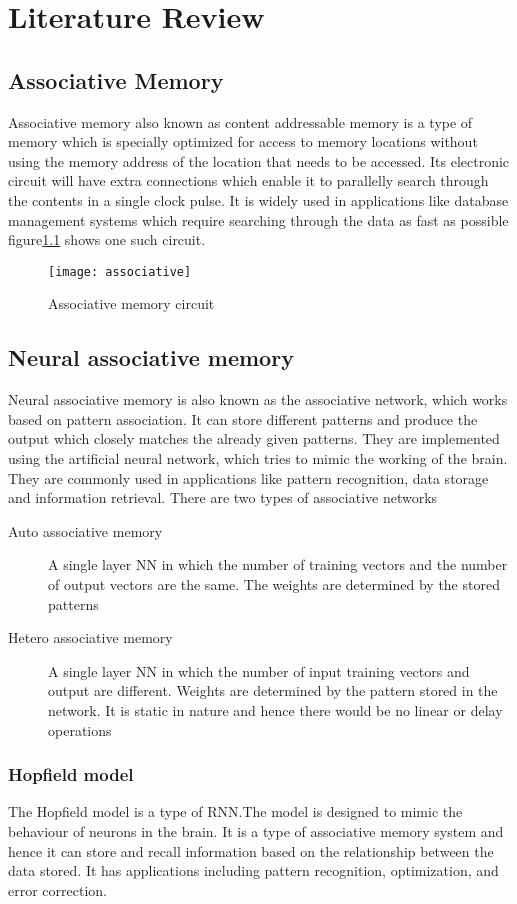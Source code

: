 \chapter{Literature Review}
\section{Associative Memory}
Associative memory also known as content addressable memory is a type of memory
which is specially optimized for access to memory locations without using the
memory address of the location that needs to be accessed. Its electronic
circuit will have extra connections which enable it to parallelly search
through the contents in a single clock pulse. It is widely used in applications
like database management systems which require searching through the data as
fast as possible figure\ref{associative_circuit} shows one such circuit.
\begin{figure}[h!]
    \centering
    \texttt{[image: associative]}
    \caption{Associative memory circuit}\label{associative_circuit}
\end{figure}

\section{Neural associative memory}
Neural associative memory is also known as the associative network, which works
based on pattern association. It can store different patterns and produce the
output which closely matches the already given patterns. They are implemented
using the artificial neural network, which tries to mimic the working of the
brain. They are commonly used in applications like pattern recognition, data
storage and information retrieval. There are two types of associative networks
\begin{description}
    \item[Auto associative memory]A single layer NN in which the number of training
    vectors and the number of output vectors are the same. The weights are
    determined by the stored patterns
    \item[Hetero associative memory]A single layer NN in which the number of input
    training vectors and output are different. Weights are determined by the
    pattern stored in the network. It is static in nature and hence there would be
    no linear or delay operations
\end{description}

\subsection{Hopfield model}
The Hopfield model\cite{hopfield} is a type of RNN.\@ The model is designed to
mimic the behaviour of neurons in the brain. It is a type of associative memory
system and hence it can store and recall information based on the relationship
between the data stored. It has applications including pattern recognition,
optimization, and error correction.

